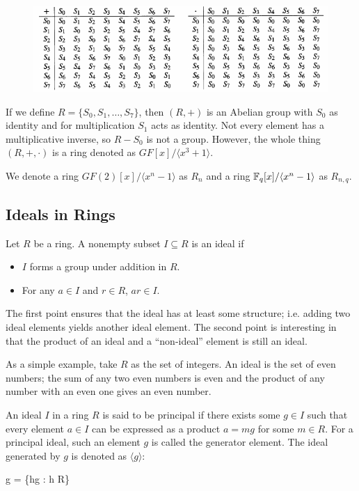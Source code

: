 \begin{figure}[H]
  \includegraphics[scale=0.75]{images/cyclic_codes_03.png}
\end{figure}

If we define $R=\{S_0, S_1,\ldots, S_7\}$, then $(R,+)$ is an Abelian group with $S_0$ as identity and for multiplication $S_1$ acts as identity. Not every element has a multiplicative inverse, so $R - S_0$ is not a group. However, the whole thing $(R,+,\cdot)$ is a ring denoted as $GF[x]/\langle x^3+1 \rangle$.

We denote a ring $GF(2)[x]/\langle x^n-1 \rangle$ as $R_n$ and a ring $\mathbb{F}_q[x]/\langle x^n-1\rangle$ as $R_{n,q}$.

\subsection{Ideals in Rings}

\begin{definition}
  Let $R$ be a ring. A nonempty subset $I \subseteq R$ is an ideal if

  \begin{itemize}
    \item $I$ forms a group under addition in $R$.
    \item For any $a \in I$ and $r \in R$, $ar \in I$.
  \end{itemize}
\end{definition}

The first point ensures that the ideal has at least some structure; i.e. adding two ideal elements yields another ideal element. The second point is interesting in that the product of an ideal and a ``non-ideal'' element is still an ideal.

As a simple example, take $R$ as the set of integers. An ideal is the set of even numbers; the sum of any two even numbers is even and the product of any number with an even one gives an even number.

\begin{definition}
  An ideal $I$ in a ring $R$ is said to be principal if there exists some $g \in I$ such that every element $a \in I$ can be expressed as a product $a = mg$ for some $m \in R$. For a principal ideal, such an element $g$ is called the generator element. The ideal generated by $g$ is denoted as $\langle g \rangle$:

  \bee
    \langle g \rangle = \{hg : h \in R\}
  \eee
  
\end{definition}

